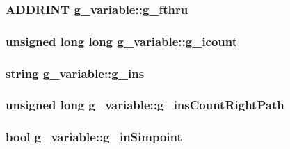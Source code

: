 \label{structg__variable_aee7d9a2652e4ea63755601664d7f2a00}
\hypertarget{structg__variable_ab5c10d6f80328bc1f3c99709d7d5db46}{
\subsubsection[{g\_\-fthru}]{\setlength{\rightskip}{0pt plus 5cm}ADDRINT {\bf g\_\-variable::g\_\-fthru}}}
\label{structg__variable_ab5c10d6f80328bc1f3c99709d7d5db46}
\hypertarget{structg__variable_a9ab79f56074bb46d6ae7d797c52442f3}{
\subsubsection[{g\_\-icount}]{\setlength{\rightskip}{0pt plus 5cm}unsigned long long {\bf g\_\-variable::g\_\-icount}}}
\label{structg__variable_a9ab79f56074bb46d6ae7d797c52442f3}
\hypertarget{structg__variable_aa7824f9bbc1a8ff7548bcf42922c0c2b}{
\subsubsection[{g\_\-ins}]{\setlength{\rightskip}{0pt plus 5cm}string {\bf g\_\-variable::g\_\-ins}}}
\label{structg__variable_aa7824f9bbc1a8ff7548bcf42922c0c2b}
\hypertarget{structg__variable_a9849ae320434c4f9d060f131e24509fd}{
\subsubsection[{g\_\-insCountRightPath}]{\setlength{\rightskip}{0pt plus 5cm}unsigned long {\bf g\_\-variable::g\_\-insCountRightPath}}}
\label{structg__variable_a9849ae320434c4f9d060f131e24509fd}
\hypertarget{structg__variable_a1bfe24cfc139671202d50d3617bc3095}{
\subsubsection[{g\_\-inSimpoint}]{\setlength{\rightskip}{0pt plus 5cm}bool {\bf g\_\-variable::g\_\-inSimpoint}}}
